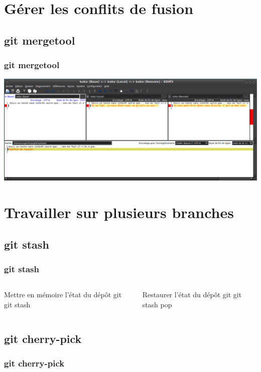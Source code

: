 \documentclass[t,11pt]{beamer}
\begin{document}
\section{G\'erer les conflits de fusion}
\subsection{git mergetool}
\begin{frame}
        \frametitle{git mergetool}
        \centering
        \vspace{8mm}
        \includegraphics[width=\linewidth,height=\textheight,keepaspectratio]{./img/git-mergetool-kdiff3.png}
\end{frame}

\section{Travailler sur plusieurs branches}
\subsection{git stash}
\begin{frame}
        \frametitle{git stash}
        \begin{columns}

                \begin{block}{Mettre en mémoire l'état du d\'ep\^ot git}
                        git stash
                \end{block}

                \begin{block}{Restaurer l'état du d\'ep\^ot git}
                        git stash pop
                \end{block}
        \end{columns}
\end{frame}

\subsection{git cherry-pick}
\begin{frame}
        \frametitle{git cherry-pick}
\end{frame}
\end{document}
